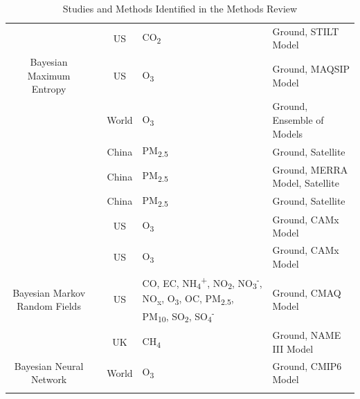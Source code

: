 \begin{landscape}
\begin{longtable}{c p{4cm} c p{4cm} p{6cm}}
  & \cite{Turner2016Long-TermStudy} & US & CO\textsubscript{2} & Ground, STILT Model  \\
  
 Bayesian Maximum Entropy &  \cite{deNazelle2006OzonePrediction} & US & O\textsubscript{3} & Ground, MAQSIP Model  \\
   
   & \cite{Delang2021Mapping1990-2017b} & World & O\textsubscript{3} & Ground, Ensemble of Models  \\
   
  & \cite{He2018Space-timeApproachc} & China & PM\textsubscript{2.5} & Ground, Satellite  \\

  & \cite{He2020Space-timeTechniques} & China & PM\textsubscript{2.5} & Ground, MERRA Model, Satellite  \\
  
 & \cite{Xiao2018High-resolutionTechnique} & China & PM\textsubscript{2.5} & Ground, Satellite  \\
 
  & \cite{Xu2016BayesianApplicationb} & US & O\textsubscript{3} & Ground, CAMx Model  \\
  
   & \cite{Xu2017ImpactMisclassificationb} & US & O\textsubscript{3} & Ground, CAMx Model  \\
   
 Bayesian Markov Random Fields & \cite{Gong2021MultivariateINLA.} & US & CO, EC, NH\textsubscript{4}\textsuperscript{+}, NO\textsubscript{2}, NO\textsubscript{3}\textsuperscript{-}, NO\textsubscript{x}, O\textsubscript{3}, OC, PM\textsubscript{2.5}, PM\textsubscript{10}, SO\textsubscript{2}, SO\textsubscript{4}\textsuperscript{-} & Ground, CMAQ Model  \\
  
 & \cite{Western2020BayesianFieldsc} & UK & CH\textsubscript{4} & Ground, NAME III Model  \\
 
 Bayesian Neural Network & \cite{Sun2021Multi-stageModelsb} & World & O\textsubscript{3} & Ground, CMIP6 Model \\
 
\caption{Studies and Methods Identified in the Methods Review}
\label{table:Methods Review}
\end{longtable}
\end{landscape}

